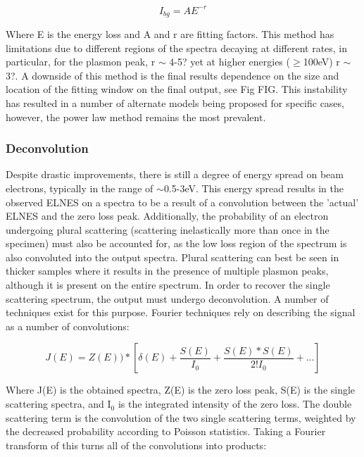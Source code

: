 \begin{equation}
	I_{bg} = AE^{-r}
\end{equation}

Where E is the energy loss and A and r are fitting factors.  This method has limitations due to different regions of the spectra decaying at different rates, in particular, for the plasmon peak, r $\sim$ 4-5? yet at higher energies ($\ge$100eV) r $\sim$ 3?.  A downside of this method is the final results dependence on the size and location of the fitting window on the final output, see Fig FIG.  This instability has resulted in a number of alternate models being proposed for specific cases, however, the power law method remains the most prevalent.  

\subsubsection{Deconvolution}
Despite drastic improvements, there is still a degree of energy spread on beam electrons, typically in the range of $\sim$0.5-3eV.  This energy spread results in the observed ELNES on a spectra to be a result of a convolution between the 'actual' ELNES and the zero loss peak.  Additionally, the probability of an electron undergoing plural scattering (scattering inelastically more than once in the specimen) must also be accounted for, as the low loss region of the spectrum is also convoluted into the output spectra.  Plural scattering can best be seen in thicker samples where it results in the presence of multiple plasmon peaks, although it is present on the entire spectrum.  In order to recover the single scattering spectrum, the output must undergo deconvolution.  A number of techniques exist for this purpose.   Fourier techniques rely on describing the signal as a number of convolutions:

\begin{equation}
 	J(E) = Z(E))\ast[\delta(E) + \frac{S(E)}{I_0} +  \frac{S(E) \ast S(E)}{2! I_0}   + ...]
\end{equation}



Where J(E) is the obtained spectra, Z(E) is the zero loss peak, S(E) is the single scattering spectra, and I$_0$ is the integrated intensity of the zero loss.  The double scattering term is the convolution of the two single scattering terms, weighted by the decreased probability according to Poisson statistics.   Taking a Fourier transform of this turns all of the convolutions into products: 

